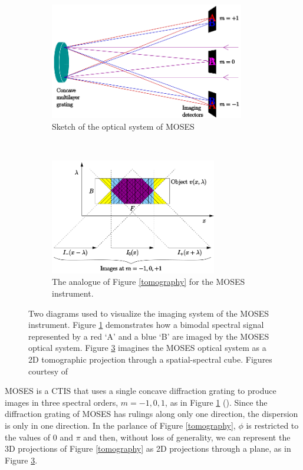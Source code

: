 \documentclass[10pt, letter]{article}
\begin{document}
				\begin{figure}[h!]
					\centering
					\begin{subfigure}[t]{0.49\textwidth}
						\centering
						\includegraphics[height=2in]{figures/concave}
						\caption{Sketch of the optical system of MOSES}
						\label{optics}
					\end{subfigure}	
					~
					\begin{subfigure}[t]{0.49\textwidth}
						\centering
						\includegraphics[height=2in]{figures/moses_cube}
						\caption{The analogue of Figure \ref{tomography} for the MOSES instrument.}
						\label{moses_tomo}
					\end{subfigure}	
					\caption{Two diagrams used to visualize the imaging system of the MOSES instrument. Figure \ref{optics} demonstrates how a bimodal spectral signal represented by a red `A' and a blue `B' are imaged by the MOSES optical system. Figure \ref{moses_tomo} imagines the MOSES optical system as a 2D tomographic projection through a spatial-spectral cube. Figures courtesy of \cite{fox1}}
				\end{figure}
				MOSES is a CTIS that uses a single concave diffraction grating to produce images in three spectral orders, $m=-1,0,1$, as in Figure \ref{optics} (\cite{kankel1}).
				Since the diffraction grating of MOSES has rulings along only one direction, the dispersion is only in one direction. In the parlance of Figure \ref{tomography}, $\phi$ is restricted to the values of 0 and $\pi$ and then, without loss of generality, we can represent the 3D projections of Figure \ref{tomography} as 2D projections through a plane, as in Figure \ref{moses_tomo}.
				
\end{document}
